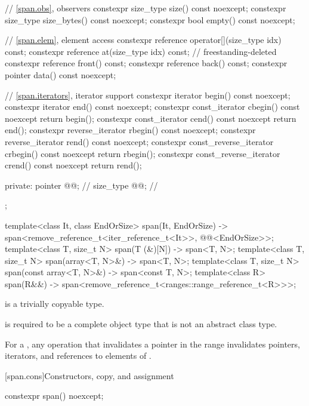 \begin{codeblock}
{{    // \ref{span.obs}, observers
    constexpr size_type size() const noexcept;
    constexpr size_type size_bytes() const noexcept;
    constexpr bool empty() const noexcept;

    // \ref{span.elem}, element access
    constexpr reference operator[](size_type idx) const;
    constexpr reference at(size_type idx) const;                            // freestanding-deleted
    constexpr reference front() const;
    constexpr reference back() const;
    constexpr pointer data() const noexcept;

    // \ref{span.iterators}, iterator support
    constexpr iterator begin() const noexcept;
    constexpr iterator end() const noexcept;
    constexpr const_iterator cbegin() const noexcept { return begin(); }
    constexpr const_iterator cend() const noexcept { return end(); }
    constexpr reverse_iterator rbegin() const noexcept;
    constexpr reverse_iterator rend() const noexcept;
    constexpr const_reverse_iterator crbegin() const noexcept { return rbegin(); }
    constexpr const_reverse_iterator crend() const noexcept { return rend(); }

  private:
    pointer @@;              // \expos
    size_type @@;            // \expos
  };

  template<class It, class EndOrSize>
    span(It, EndOrSize) -> span<remove_reference_t<iter_reference_t<It>>,
                                @@<EndOrSize>>;
  template<class T, size_t N>
    span(T (&)[N]) -> span<T, N>;
  template<class T, size_t N>
    span(array<T, N>&) -> span<T, N>;
  template<class T, size_t N>
    span(const array<T, N>&) -> span<const T, N>;
  template<class R>
    span(R&&) -> span<remove_reference_t<ranges::range_reference_t<R>>>;
}
\end{codeblock}

\pnum
{} is
a trivially copyable type.

\pnum
{} is required to be
a complete object type that is not an abstract class type.

\pnum
For a  ,
any operation that invalidates a pointer in
the range 
invalidates pointers, iterators, and references to elements of .

[span.cons]{Constructors, copy, and assignment}

%
\begin{itemdecl}
constexpr span() noexcept;
\end{itemdecl}

